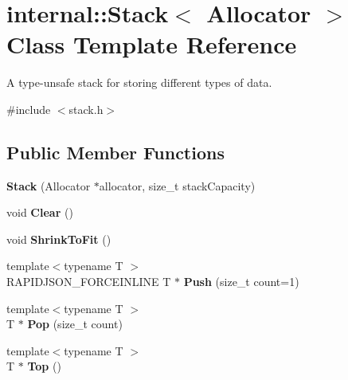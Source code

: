 \hypertarget{classinternal_1_1Stack}{}\section{internal\+:\+:Stack$<$ Allocator $>$ Class Template Reference}
\label{classinternal_1_1Stack}


A type-\/unsafe stack for storing different types of data.  




{\ttfamily \#include $<$stack.\+h$>$}

\subsection*{Public Member Functions}
\begin{DoxyCompactItemize}
\item 
\mbox{\label{classinternal_1_1Stack_af09ab91f9e5143deccf7c9af837f451e}} 
{\bfseries Stack} (Allocator $\ast$allocator, size\+\_\+t stack\+Capacity)
\item 
\mbox{\label{classinternal_1_1Stack_a02da31665a372738e81ded2f7b7d598e}} 
void {\bfseries Clear} ()
\item 
\mbox{\label{classinternal_1_1Stack_a3852b8494d69c91f6a238a51572e591e}} 
void {\bfseries Shrink\+To\+Fit} ()
\item 
\mbox{\label{classinternal_1_1Stack_a8038223ec0ed6ea92bb5f48e645a25ca}} 
{\footnotesize template$<$typename T $>$ }\\R\+A\+P\+I\+D\+J\+S\+O\+N\+\_\+\+F\+O\+R\+C\+E\+I\+N\+L\+I\+NE T $\ast$ {\bfseries Push} (size\+\_\+t count=1)
\item 
\mbox{\label{classinternal_1_1Stack_a8545a8ccba595ac6e4ade9784474aa1c}} 
{\footnotesize template$<$typename T $>$ }\\T $\ast$ {\bfseries Pop} (size\+\_\+t count)
\item 
\mbox{\label{classinternal_1_1Stack_ab3ed5b4afed3c73c516678516d5e195b}} 
{\footnotesize template$<$typename T $>$ }\\T $\ast$ {\bfseries Top} ()

\end{DoxyCompactItemize}
